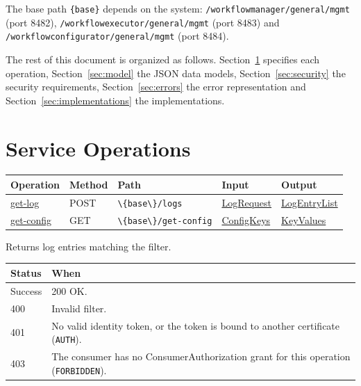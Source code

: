\documentclass[a4paper]{arrowhead}
\newcommand{\mref}[1]{{\textcolor{ArrowheadPurple}{\hyperref[sec:model:#1]{#1}}}}
\newcommand{\oref}[1]{{\textcolor{ArrowheadBlue}{\hyperref[sec:operations:#1]{#1}}}}
\begin{document}
The base path \texttt{\{base\}} depends on the system: \texttt{/\allowbreak{}workflowmanager/\allowbreak{}general/\allowbreak{}mgmt} (port 8482),
\texttt{/\allowbreak{}workflowexecutor/\allowbreak{}general/\allowbreak{}mgmt} (port 8483) and \texttt{/\allowbreak{}workflowconfigurator/\allowbreak{}general/\allowbreak{}mgmt} (port 8484).

The rest of this document is organized as follows. Section~\ref{sec:operations} specifies each operation,
Section~\ref{sec:model} the JSON data models, Section~\ref{sec:security} the security requirements,
Section~\ref{sec:errors} the error representation and Section~\ref{sec:implementations} the implementations.

\newpage
\section{Service Operations}
\label{sec:operations}

{\small
\begin{longtable}{|p{3.0cm}|p{1.5cm}|p{5.3cm}|p{3.0cm}|p{3.0cm}|}

\hline
\rowcolor{gray!33} Operation & Method & Path & Input & Output \\ \hline
\endhead
\oref{get-log} & POST & \texttt{\textbackslash{}\{base\textbackslash{}\}/\allowbreak{}logs} & \mref{LogRequest} & \mref{LogEntryList} \\ \hline
\oref{get-config} & GET & \texttt{\textbackslash{}\{base\textbackslash{}\}/\allowbreak{}get-\allowbreak{}config} & \mref{ConfigKeys} & \mref{KeyValues} \\ \hline
\end{longtable}
}

Returns log entries matching the filter.

{\small
\begin{longtable}{|p{2.0cm}|p{13.8cm}|}

\hline
\rowcolor{gray!33} Status & When \\ \hline
\endhead
Success & 200 OK. \\ \hline
400 & Invalid filter. \\ \hline
401 & No valid identity token, or the token is bound to another certificate (\texttt{AUTH}). \\ \hline
403 & The consumer has no ConsumerAuthorization grant for this operation (\texttt{FORBIDDEN}). \\ \hline
\end{longtable}
}
\end{document}
